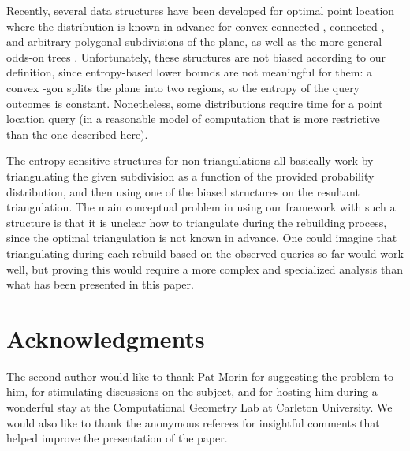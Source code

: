 \documentclass[11pt]{article}
\begin{document}
Recently,
several data structures have been developed for optimal point location where
the distribution is known in advance for convex connected
\cite{ColletteDuIaLaMo08}, connected
\cite{ColletteDuIaLaMo09}, and arbitrary polygonal
\cite{BoseDeDoDuKiMo10} subdivisions of the plane,
as well as the more general odds-on trees \cite{BoseDeDoDuKiMo10a}.
Unfortunately, these structures are not biased according to our
definition, since entropy-based lower bounds 
are not meaningful for them: a convex -gon splits the
plane into two regions, so the entropy of the query outcomes is constant.
Nonetheless, some distributions require
 time for a point location query (in a reasonable model
of computation that is more restrictive than the one described here).

The entropy-sensitive structures for
non-triangulations all basically work by triangulating the given subdivision as
a function of the provided probability distribution, and then using one of the
biased structures on the resultant triangulation. The main conceptual problem
in using our framework with such a structure is that it is  unclear how to
triangulate during the rebuilding process, since the optimal triangulation is
not known in advance. One could imagine that triangulating during each rebuild
based on the observed queries so far would work well, but proving this would
require a more complex and specialized analysis than what has been presented in
this paper.

\section*{Acknowledgments}

The second author would like to thank Pat Morin for suggesting the 
problem to him, for stimulating discussions on the subject,  and for 
hosting him during a wonderful stay at the Computational
Geometry Lab at Carleton University.
We would also like to thank the anonymous referees for 
insightful comments that helped improve the presentation of
the paper.
\end{document}
